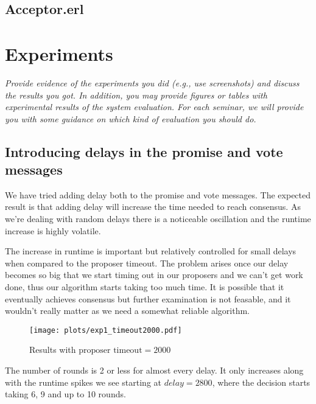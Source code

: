 \documentclass[a4paper, 10pt]{article}
\begin{document}
    

\subsection{Acceptor.erl}



\section{Experiments}
\textit{Provide evidence of the experiments you did (e.g., use screenshots) and discuss the results you got. In addition, you may provide figures or tables with experimental results of the system evaluation. For each seminar, we will provide you with some guidance on which kind of evaluation you should do.}

\subsection{Introducing delays in the promise and vote messages}

We have tried adding delay both to the promise and vote messages. The expected result is 
that adding delay will increase the time needed to reach consensus. As we're dealing with
random delays there is a noticeable oscillation and the runtime increase is highly volatile.


The increase in runtime is important but relatively controlled for small delays when compared
to the proposer timeout. The problem arises once our delay becomes so big that we start 
timing out in our proposers and we can't get work done, thus our algorithm starts taking too
much time. It is possible that it eventually achieves consensus but further examination 
is not feasable, and it wouldn't really matter as we need a somewhat reliable algorithm. 


\begin{figure}[H]
  \centering
  \texttt{[image: plots/exp1\_timeout2000.pdf]}
    \caption{Results with $\text{proposer timeout}=2000$}
\end{figure}

The number of rounds is 2 or less for almost every delay. It only increases along with the runtime spikes we see starting at $delay=2800$, where the decision starts taking 6, 9 and up to 10 rounds.

\end{document}
